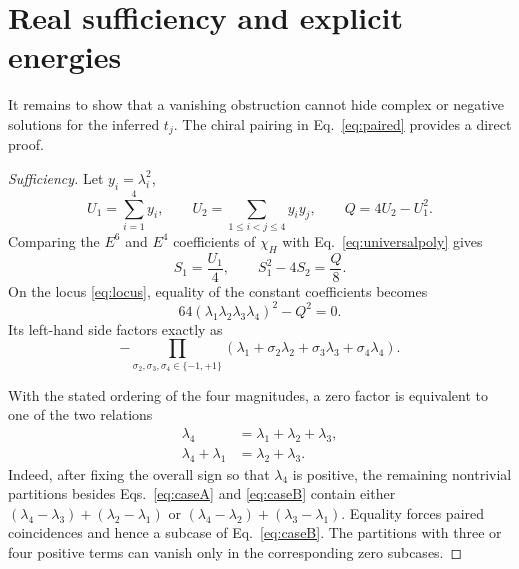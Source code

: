 \documentclass[
  aps,
  pra,
  reprint,
  superscriptaddress,
  nofootinbib,
  longbibliography
]{revtex4-2}
\begin{document}
\section{Real sufficiency and explicit energies}
\label{sec:sufficiency}

It remains to show that a vanishing obstruction cannot hide complex or negative
solutions for the inferred \(t_j\).  The chiral pairing in Eq.~\eqref{eq:paired}
provides a direct proof.

\begin{proof}[Sufficiency]

Let \(y_i=\lambda_i^2\),
\begin{equation}
 U_1=\sum_{i=1}^4y_i,\qquad
 U_2=\sum_{1\leq i<j\leq4}y_iy_j,
 \qquad Q=4U_2-U_1^2.
 \label{eq:Udefs}
\end{equation}
Comparing the \(E^6\) and \(E^4\) coefficients of \(\chi_H\) with
Eq.~\eqref{eq:universalpoly} gives
\begin{equation}
 S_1=\frac{U_1}{4},\qquad S_1^2-4S_2=\frac{Q}{8}.
 \label{eq:SQ}
\end{equation}
On the locus \eqref{eq:locus}, equality of the constant coefficients becomes
\begin{equation}
 64(\lambda_1\lambda_2\lambda_3\lambda_4)^2-Q^2=0.
 \label{eq:lambdaobstruction}
\end{equation}
Its left-hand side factors exactly as
\begin{equation}
 -\!\!\prod_{\sigma_2,\sigma_3,\sigma_4\in\{-1,+1\}}
 (\lambda_1+\sigma_2\lambda_2+\sigma_3\lambda_3+
 \sigma_4\lambda_4).
 \label{eq:linearproduct}
\end{equation}

With the stated ordering of the four magnitudes, a zero factor is equivalent to one of
the two relations
\begin{align}
 \lambda_4&=\lambda_1+\lambda_2+\lambda_3,
 \label{eq:caseA}\\
 \lambda_4+\lambda_1&=\lambda_2+\lambda_3.
 \label{eq:caseB}
\end{align}
Indeed, after fixing the overall sign so that \(\lambda_4\) is positive, the remaining
nontrivial partitions besides Eqs.~\eqref{eq:caseA} and \eqref{eq:caseB} contain either
\((\lambda_4-\lambda_3)+(\lambda_2-\lambda_1)\) or
\((\lambda_4-\lambda_2)+(\lambda_3-\lambda_1)\).  Equality forces paired coincidences
and hence a subcase of Eq.~\eqref{eq:caseB}.  The partitions with three or four positive
terms can vanish only in the corresponding zero subcases.


\end{proof}
\end{document}
